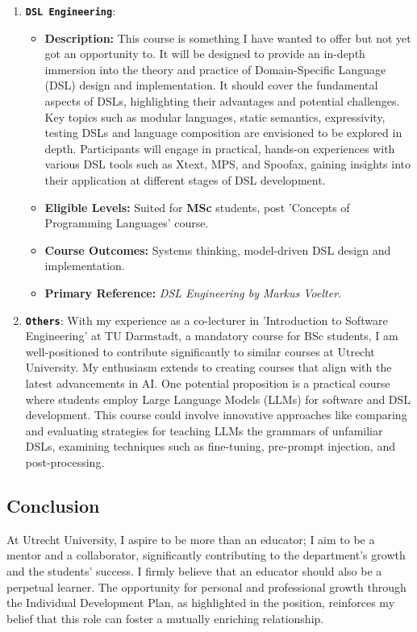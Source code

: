 \documentclass[10pt,a4paper,sans]{moderncv}
\begin{document}
\begin{enumerate}
    \item \textbf{\texttt{DSL Engineering}}:
    \begin{itemize}
        \item \textbf{Description:} This course is something I have wanted to offer but not yet got an opportunity to. It will be designed to provide an in-depth immersion into the theory and practice of Domain-Specific Language (DSL) design and implementation. It should cover the fundamental aspects of DSLs, highlighting their advantages and potential challenges. Key topics such as modular languages, static semantics, expressivity, testing DSLs and language composition are envisioned to be explored in depth. Participants will engage in practical, hands-on experiences with various DSL tools such as Xtext, MPS, and Spoofax, gaining insights into their application at different stages of DSL development.
        \item \textbf{Eligible Levels:} Suited for \textbf{MSc} students, post 'Concepts of Programming Languages' course.
        \item \textbf{Course Outcomes:} Systems thinking, model-driven DSL design and implementation.
        \item \textbf{Primary Reference:} \textit{DSL Engineering by Markus Voelter}.
    \end{itemize}

    \item \textbf{\texttt{Others}}: With my experience as a co-lecturer in 'Introduction to Software Engineering' at TU Darmstadt, a mandatory course for BSc students, I am well-positioned to contribute significantly to similar courses at Utrecht University. My enthusiasm extends to creating courses that align with the latest advancements in AI. One potential proposition is a practical course where students employ Large Language Models (LLMs) for software and DSL development. This course could involve innovative approaches like comparing and evaluating strategies for teaching LLMs the grammars of unfamiliar DSLs, examining techniques such as fine-tuning, pre-prompt injection, and post-processing. 
\end{enumerate}


\subsection*{Conclusion}

At Utrecht University, I aspire to be more than an educator; I aim to be a mentor and a collaborator, significantly contributing to the department's growth and the students' success. I firmly believe that an educator should also be a perpetual learner. The opportunity for personal and professional growth through the Individual Development Plan, as highlighted in the position, reinforces my belief that this role can foster a mutually enriching relationship.
\end{document}
